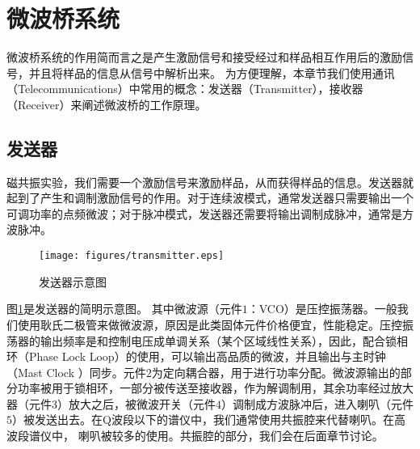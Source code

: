     \section{微波桥系统}
    微波桥系统的作用简而言之是产生激励信号和接受经过和样品相互作用后的激励信号，并且将样品的信息从信号中解析出来。
    为方便理解，本章节我们使用通讯（Telecommunications）中常用的概念：发送器（Transmitter），接收器（Receiver）来阐述微波桥的工作原理。
        \subsection{发送器}
        磁共振实验，我们需要一个激励信号来激励样品，从而获得样品的信息。发送器就起到了产生和调制激励信号的作用。对于连续波模式，通常发送器只需要输出一个可调功率的点频微波；对于脉冲模式，发送器还需要将输出调制成脉冲，通常是方波脉冲。

            \begin{figure}[htbp]
                \begin{center}
                  \texttt{[image: figures/transmitter.eps]}
                  \caption{发送器示意图
                  }
                  \label{transmitter}
                \end{center}
            \end{figure}

        图\ref{transmitter}是发送器的简明示意图。 其中微波源（元件$1$：VCO）是压控振荡器。一般我们使用耿氏二极管来做微波源，原因是此类固体元件价格便宜，性能稳定。压控振荡器的输出频率是和控制电压成单调关系（某个区域线性关系），因此，配合锁相环（Phase Lock Loop）的使用，可以输出高品质的微波，并且输出与主时钟（Mast Clock ）同步。元件$2$为定向耦合器，用于进行功率分配。微波源输出的部分功率被用于锁相环，一部分被传送至接收器，作为解调制用，其余功率经过放大器（元件$3$）放大之后，被微波开关（元件$4$）调制成方波脉冲后，进入喇叭（元件$5$）被发送出去。在Q波段以下的谱仪中，我们通常使用共振腔来代替喇叭。在高波段谱仪中，
        喇叭被较多的使用\cite{3mm_ESR, 1mm_ESR}。共振腔的部分，我们会在后面章节讨论。

